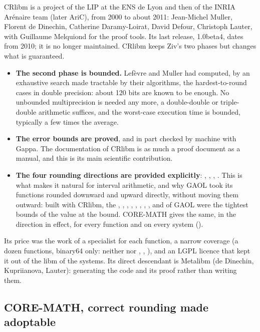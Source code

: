 \documentclass[12pt,a4paper,twoside,openright]{book}
\begin{document}
CRlibm is a project of the LIP at the ENS de Lyon and then of the INRIA
Ar\'enaire team (later AriC), from 2000 to about 2011: Jean-Michel Muller,
Florent de Dinechin, Catherine Daramy-Loirat, David Defour, Christoph
Lauter, with Guillaume Melquiond for the proof tools. Its last release,
1.0beta4, dates from 2010; it is no longer maintained. CRlibm keeps Ziv's
two phases but changes what is guaranteed.
\begin{itemize}
\item[$\bullet$] \textbf{The second phase is bounded.} Lef\`evre and Muller
  had computed, by an exhaustive search made tractable by their algorithms,
  the hardest-to-round cases in double precision: about 120 bits are known
  to be enough. No unbounded multiprecision is needed any more, a
  double-double or triple-double arithmetic suffices, and the worst-case
  execution time is bounded, typically a few times the average.
\item[$\bullet$] \textbf{The error bounds are proved}, and in part checked
  by machine with Gappa. The documentation of CRlibm is as much a proof
  document as a manual, and this is its main scientific contribution.
\item[$\bullet$] \textbf{The four rounding directions are provided
  explicitly}: , , ,
  . This is what makes it natural for interval arithmetic,
  and why GAOL took its functions rounded downward and upward directly,
  without moving them outward: built with CRlibm, the ,
  , , , , , ,
  ,  and  of GAOL were the tightest bounds
  of the value at the bound. CORE-MATH gives the same, in the direction in
  effect, for every function and on every system
  ().
\end{itemize}
Its price was the work of a specialist for each function, a narrow coverage
(a dozen functions, binary64 only: neither  nor ,
, ), and an LGPL licence that kept it out of the
libm of the systems. Its direct descendant is Metalibm (de Dinechin,
Kupriianova, Lauter): generating the code and its proof rather than writing
them.

\subsection{CORE-MATH, correct rounding made adoptable}
\end{document}
